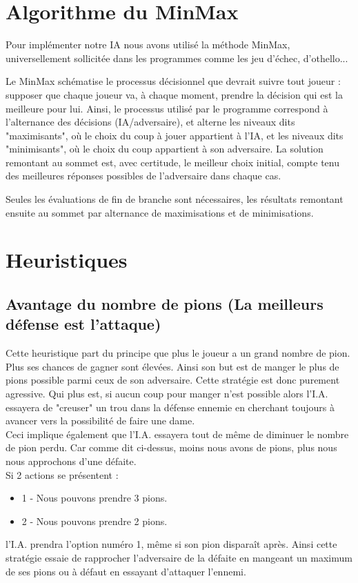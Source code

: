 \documentclass[10pt,a4paper]{report}
\begin{document}
\section{Algorithme du MinMax}
	Pour implémenter notre IA nous avons utilisé la méthode MinMax, universellement sollicitée dans les programmes comme les jeu d'échec, d'othello...

Le MinMax schématise le processus décisionnel que devrait suivre tout joueur : supposer que chaque joueur va, à chaque moment, prendre la décision qui est la meilleure pour lui. 
Ainsi, le processus utilisé par le programme correspond à l'alternance des décisions (IA/adversaire), et alterne les niveaux dits "maximisants", où le choix du coup à jouer appartient à l'IA, et les niveaux dits "minimisants", où le choix du coup appartient à son adversaire. La solution remontant au sommet est, avec certitude, le meilleur choix initial, compte tenu des meilleures réponses possibles de l'adversaire dans chaque cas.

Seules les évaluations de fin de branche sont nécessaires, les résultats remontant ensuite au sommet par alternance de maximisations et de minimisations.

\section{Heuristiques}

	\subsection{Avantage du nombre de pions (La meilleurs défense est l'attaque) }
	
	Cette heuristique part du principe que plus le joueur a un grand nombre de pion. Plus ses chances de gagner sont élevées. Ainsi son but est de manger le plus de pions possible parmi ceux de son adversaire.
	Cette stratégie est donc purement agressive. Qui plus est, si aucun coup pour manger n'est possible alors l'I.A. essayera de "creuser" un trou dans la défense ennemie en cherchant toujours à avancer vers la possibilité de faire une dame. \\
	
	Ceci implique également que l'I.A. essayera tout de même de diminuer le nombre de pion perdu.
	Car comme dit ci-dessus, moins nous avons de pions, plus nous nous approchons d'une défaite. \\
	
	Si 2 actions se présentent : 
	\begin{itemize}
		\item 1 - Nous pouvons prendre 3 pions.
		\item 2 - Nous pouvons prendre 2 pions.
	\end{itemize}
	l'I.A. prendra l'option numéro 1, même si son pion disparaît après.
	Ainsi cette stratégie essaie de rapprocher l'adversaire de la défaite en mangeant un maximum de ses pions ou à défaut en essayant d'attaquer l'ennemi.
\end{document}
